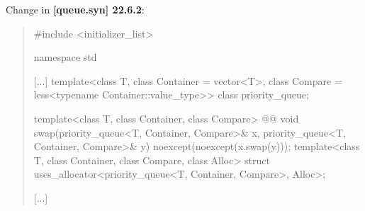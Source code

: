 \documentclass{wg21}
\begin{document}
Change in \textbf{[queue.syn] 22.6.2}:
\begin{quote}
\begin{codeblock}
#include <initializer_list>

namespace std {
  [...]	
  template<class T, class Container = vector<T>,
           class Compare = less<typename Container::value_type>>
    class priority_queue;
  
  template<class T, class Container, class Compare>
    @@ void swap(priority_queue<T, Container, Compare>& x,
      priority_queue<T, Container, Compare>& y) noexcept(noexcept(x.swap(y)));
  template<class T, class Container, class Compare, class Alloc>
    struct uses_allocator<priority_queue<T, Container, Compare>, Alloc>;
}
\end{codeblock}
[...]
\end{quote}
\end{document}
